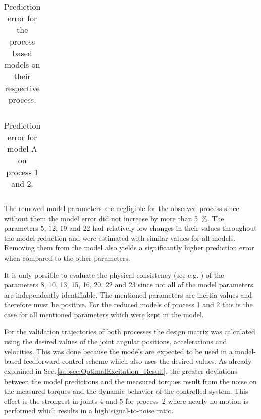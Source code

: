 \begin{table}[tb]
	\caption{Prediction error for the process based models on their respective process.}\label{tab:errorProcessOnProcess}
	\vspace{-0.2cm}
	\centering
	\begin{tabular}[h]{|r||c|c||c|c|}\hline
		
		\hline
	\end{tabular}
\end{table}

\begin{table}[tb]
	\caption{Prediction error for model A on process 1 and 2.}\label{tab:errorModelAOnProcess}
	\centering
	\vspace{-0.2cm}
	\begin{tabular}[h]{|r||c|c||c|c|}\hline
		
		\hline
	\end{tabular}
\end{table}

%		

The removed model parameters are negligible for the observed process since without them the model error did not increase by more than \SI{5}{\%}. The parameters $5$, $12$, $19$ and $22$ had relatively low changes in their values throughout the model reduction and were estimated with similar values for all models. Removing them from the model also yields a significantly higher prediction error when compared to the other parameters.

It is only possible to evaluate the physical consistency (see e.g. \cite{Gautier.2013}) of the parameters 8, 10, 13, 15, 16, 20, 22 and 23 since not all of the model parameters are independently identifiable. The mentioned parameters are inertia values and therefore must be positive. For the reduced models of process 1 and 2 this is the case for all mentioned parameters which were kept in the model.

For the validation trajectories of both processes the design matrix was calculated using the desired values of the joint angular positions, accelerations and velocities. This was done because the models are expected to be used in a model-based feedforward control scheme which also uses the desired values. As already explained in Sec.\,\ref{subsec:OptimalExcitation_Result}, the greater deviations between the model predictions and the measured torques result from the noise on the measured torques and the dynamic behavior of the controlled system. This effect is the strongest in joints 4 and 5 for process~2 where nearly no motion is performed which results in a high signal-to-noise ratio.

